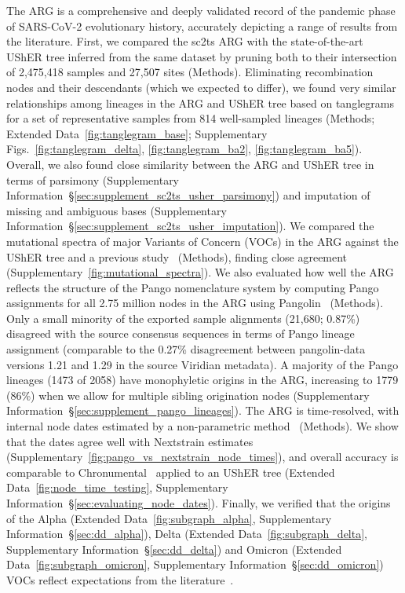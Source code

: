 \documentclass[12pt]{article}
\makeatletter
\newcommand{\supref}[1]{Supplementary Information~\S\ref{#1}}
\newcommand{\edref}[1]{Extended Data~\ref{#1}}
\newcommand{\siref}[1]{Supplementary~\ref{#1}}
\newcommand{\refprefix}[1]{#1~}
\newcommand{\numref}[1]{{\let\refprefix\@gobble\ref{#1}}}
\makeatother
\begin{document}
The ARG is a comprehensive and deeply validated record of
the pandemic phase of SARS-CoV-2 evolutionary history,
accurately depicting a range of results from the literature.
First, we compared the sc2ts ARG
with the state-of-the-art UShER tree inferred from the same dataset
by pruning both to their intersection of
2,475,418 samples and 27,507 sites (Methods).
Eliminating recombination nodes and their descendants (which we expected to differ),
we found very similar relationships among lineages in
the ARG and UShER tree based on tanglegrams
for a set of representative samples from 814 well-sampled lineages
(Methods; \edref{fig:tanglegram_base};
Supplementary Figs.~\numref{fig:tanglegram_delta},
\numref{fig:tanglegram_ba2},
\numref{fig:tanglegram_ba5}).
Overall, we also found close similarity between the ARG
and UShER tree in terms of parsimony
(\supref{sec:supplement_sc2ts_usher_parsimony})
and imputation of missing and ambiguous bases
(\supref{sec:supplement_sc2ts_usher_imputation}).
We compared the mutational spectra of major Variants of Concern (VOCs) in the ARG
against the UShER tree and a previous study~\cite{Bloom2023} (Methods),
finding close agreement (\siref{fig:mutational_spectra}).
We also evaluated how well the ARG reflects the structure of
the Pango nomenclature system
by computing Pango assignments for all 2.75 million nodes in the ARG
using Pangolin~\cite{OToole2021assignment} (Methods).
Only a small minority of the exported sample alignments (21,680; 0.87\%) disagreed
with the source consensus sequences in terms of Pango lineage assignment
(comparable to the 0.27\% disagreement between pangolin-data
versions 1.21 and 1.29 in the source Viridian metadata).
A majority of the Pango lineages (1473 of 2058)
have monophyletic origins in the ARG,
increasing to 1779 (86\%) when we allow
for multiple sibling origination nodes
(\supref{sec:supplement_pango_lineages}).
The ARG is time-resolved, with internal node dates estimated
by a non-parametric method~\cite{Pope2025} (Methods).
We show that the dates agree well with
Nextstrain estimates (\siref{fig:pango_vs_nextstrain_node_times}),
and overall accuracy is comparable to
Chronumental~\cite{sanderson2021chronumental} applied to
an UShER tree (\edref{fig:node_time_testing},
\supref{sec:evaluating_node_dates}).
Finally, we verified
that the origins of the
Alpha (\edref{fig:subgraph_alpha}, \supref{sec:dd_alpha}),
Delta (\edref{fig:subgraph_delta}, \supref{sec:dd_delta})
and
Omicron (\edref{fig:subgraph_omicron}, \supref{sec:dd_omicron})
VOCs reflect expectations from the literature~\cite{RambautAlpha2020,ECDCreport,
Cherian2021,Farinholt2021,Stern2021,Dor2025,RambautOmicron2021}.
\end{document}
